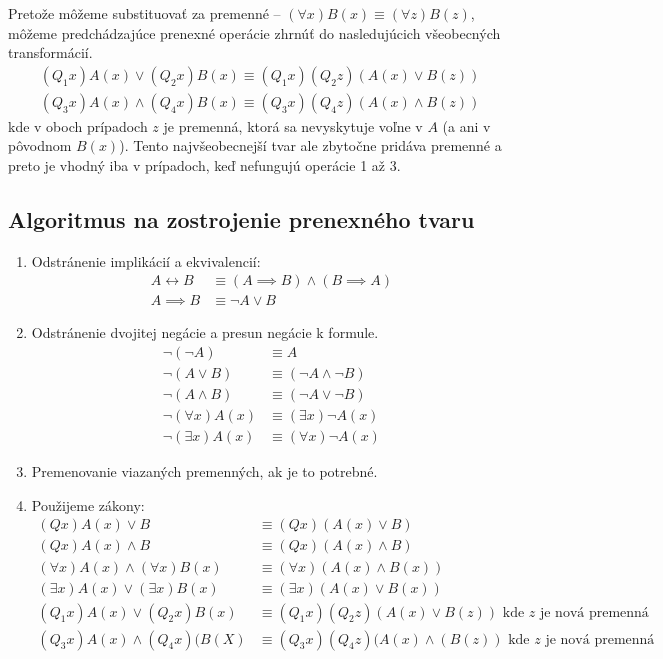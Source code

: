 Pretože môžeme substituovať za premenné --
    $(\forall x) B(x) \equiv (\forall z) B(z)$, môžeme predchádzajúce
prenexné operácie zhrnúť do nasledujúcich všeobecných transformácií.
\begin{align*}
    (Q_1 x)A(x) \lor (Q_2 x)B(x) \equiv 
        (Q_1 x)(Q_2 z)(A(x) \lor B(z)) \tag{4a} \\
    (Q_3 x)A(x) \land (Q_4 x)B(x) \equiv
        (Q_3 x)(Q_4 z)(A(x) \land B(z)) \tag{4b}
\end{align*} 
kde v oboch prípadoch $z$ je premenná, ktorá sa nevyskytuje voľne v $A$
(a ani v pôvodnom $B(x)$).
Tento najvšeobecnejší tvar ale zbytočne pridáva premenné a preto je
vhodný iba v prípadoch, keď nefungujú operácie 1 až 3.
\subsection{Algoritmus na zostrojenie prenexného tvaru}

\begin{enumerate}
\item Odstránenie implikácií a ekvivalencií:
    \begin{align*}
        A \leftrightarrow B &\equiv (A \implies B) \land (B \implies A) \\
        A \implies B &\equiv \neg A \lor B
    \end{align*}

\item Odstránenie dvojitej negácie a presun negácie k formule.
    \begin{align*}
        \neg (\neg A) &\equiv A \\
        \neg (A \lor B) &\equiv (\neg A \land \neg B) \\
        \neg (A \land B) &\equiv (\neg A \lor \neg B) \\
        \neg (\forall x) A(x) &\equiv (\exists x) \neg A(x) \\
        \neg (\exists x) A(x) &\equiv (\forall x) \neg A(x)
    \end{align*}

\item  Premenovanie viazaných premenných, ak je to potrebné.

\item Použijeme zákony:
    \begin{align*}
        (Q x) A(x) \lor B &\equiv (Q x)(A(x) \lor B) \\
        (Q x)A(x) \land B &\equiv (Q x)(A(x) \land B) \\
        (\forall x) A(x) \land (\forall x)B(x) &\equiv 
            (\forall x)(A(x) \land B(x)) \\
        (\exists x)A(x) \lor (\exists x)B(x) &\equiv 
            (\exists x) (A(x)\lor B(x)) \\
        (Q_1 x) A(x) \lor (Q_2 x)B(x) &\equiv
            (Q_1 x)(Q_2 z) (A(x)\lor B(z)) \mbox{ kde $z$ je nová
            premenná} \\
        (Q_3 x) A(x) \land (Q_4 x)(B(X) &\equiv 
            (Q_3 x)(Q_4 z)(A(x) \land (B(z)) \mbox{ kde $z$ je nová
            premenná}
    \end{align*}
\end{enumerate}

